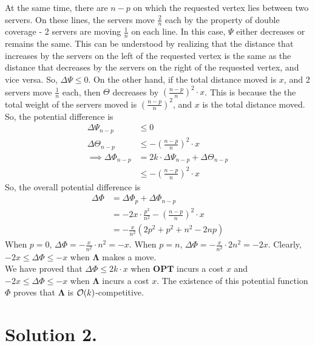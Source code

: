 \documentclass[11pt]{article}
\newcommand{\bigO}{{\cal O}}
\begin{document}
At the same time, there are $n - p$ on which the requested vertex lies between two servers. On these lines, the servers move $\frac{2}{n}$ each
by the property of double coverage - 2 servers are moving $\frac{1}{n}$ on each line. In this case,
$\Psi$ either decreases or remains the same. This can be understood by realizing that the distance that increases by the servers on the left
of the requested vertex is the same as the distance that decreases by the servers on the right of the requested vertex, and vice versa. So,
$\Delta \Psi \leq 0$. On the other hand, if the total distance moved is $x$, and 2 servers move $\frac{1}{n}$ each, then $\Theta$ decreases by
$\left( \frac{n-p}{n} \right)^{2} \cdot x$. This is because the the total weight of the servers moved is $\left(\frac{n-p}{n}\right)^{2}$, and
$x$ is the total distance moved.
So, the potential difference is
\begin{align}
    \Delta \Psi_{n-p} &\leq 0 \\
    \Delta \Theta_{n-p} &\leq -\left( \frac{n-p}{n} \right)^{2} \cdot x \\
    \implies \Delta \Phi_{n-p} &= 2k \cdot \Delta \Psi_{n-p} + \Delta \Theta_{n-p} \\
    &\leq - \left( \frac{n-p}{n} \right)^{2} \cdot x
\end{align}
So, the overall potential difference is
\begin{align}
    \Delta \Phi &= \Delta \Phi_{p} + \Delta \Phi_{n-p} \\
    &= -2x \cdot \frac{p^{2}}{n^{2}} - \left( \frac{n-p}{n} \right)^{2} \cdot x \\
    &= -\frac{x}{n^{2}} \left( 2p^{2} + p^{2} + n^{2} - 2np \right)
\end{align}
When $p = 0$, $\Delta \Phi = -\frac{x}{n^{2}} \cdot n^{2} = -x$. When $p = n$, $\Delta \Phi = -\frac{x}{n^{2}} \cdot 2n^{2} = -2x$. Clearly,
$-2x \leq \Delta \Phi \leq -x$ when $\mathbf{\Lambda}$ makes a move. \\
We have proved that $\Delta \Phi \leq 2k \cdot x$ when $\mathbf{OPT}$ incurs a cost $x$ and
$-2x \leq \Delta \Phi \leq -x$ when $\mathbf{\Lambda}$ incurs a cost $x$.
The existence of this potential function $\Phi$ proves that $\mathbf{\Lambda}$ is $\bigO(k)$-competitive.


\section*{Solution 2.}
\end{document}
